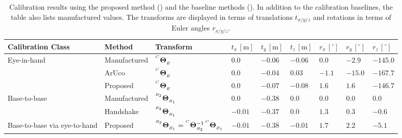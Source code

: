 \begin{landscape}
    \begin{table}[htb]
    \caption{Calibration results using the proposed method () and the baseline methods (). In addition to the calibration baselines, the table also lists manufactured values. The transforms are displayed in terms of translations $t_{x/y/z}$ and rotations in terms of Euler angles $r_{x/y/z}$.}
    \label{c1:tab:calibration_results}
    \centering
    \begin{tabular}{|l|l|l|l|l|l|l|l|l|}
    \hline
    Calibration Class             & Method       & Transform                                                                                                        & $t_x\,[\text{m}]$ & $t_y\,[\text{m}]$ & $t_z\,[\text{m}]$ & $r_x\,[^\circ]$ & $r_y\,[^\circ]$ & $r_z\,[^\circ]$ \\ \hline
    \multirow{3}{*}{Eye-in-hand}  & Manufactured & ${}^{^C}\mathbf{\Theta}_{_E}$                                                                                  & $ 0.0$            & $-0.06$           & $-0.06$           & $ 0.0$          & $-2.9$          & $-145.0$        \\ \cline{2-9} 
                                  & ArUco        & ${}^{^C}\mathbf{\Theta}_{_E}$                                                                                  & $ 0.0$            & $-0.04$           & $ 0.03$           & $-1.1$          & $-15.0$         & $-167.7$        \\ \cline{2-9} 
                                  & Proposed     & ${}^{^C}\mathbf{\Theta}_{_E}$                                                                                  & $ 0.0$            & $-0.07$           & $-0.08$           & $ 1.6$          & $ 1.6$          & $-146.7$        \\ \hline
    \multirow{2}{*}{Base-to-base} & Manufactured & ${}^{^{B_2}}\mathbf{\Theta}_{_{B_1}}$                                                                           & $ 0.0$            & $-0.38$           & $ 0.0$            & $0.0$           & $0.0$           & $ 0.0$          \\ \cline{2-9}
                                  & Handshake    & ${}^{^{B_2}}\mathbf{\Theta}_{_{B_1}}$                                                                           & $-0.01$           & $-0.37$           & $ 0.0$            & $1.3$           & $0.3$           & $-0.6$          \\ \hline
    Base-to-base via eye-to-hand  & Proposed     & ${}^{^{B_2}}\mathbf{\Theta}_{_{B_1}} = {}^{^C}\mathbf{\Theta}_{_{B_2}}^{-1}\,{}^{^C}\mathbf{\Theta}_{_{B_1}}$ & $-0.01$           & $-0.38$           & $-0.01$           & $1.7$           & $2.2$           & $-5.1$          \\ \hline
    \end{tabular}
    \end{table}
\end{landscape}
